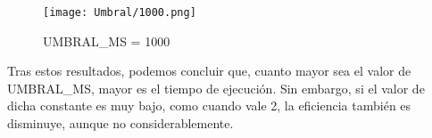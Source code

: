 \documentclass{article}
\begin{document}
\begin{figure}[H]
  \caption{UMBRAL\_MS = 1000}
  \centering
  \texttt{[image: Umbral/1000.png]}
\end{figure}

\begin{justify}
  Tras estos resultados, podemos concluir que, cuanto mayor sea el
  valor de UMBRAL\_MS, mayor es el tiempo de ejecución. Sin embargo, si
  el valor de dicha constante es muy bajo, como cuando vale 2, la
  eficiencia también es disminuye, aunque no considerablemente.
  
\end{justify}
\end{document}
